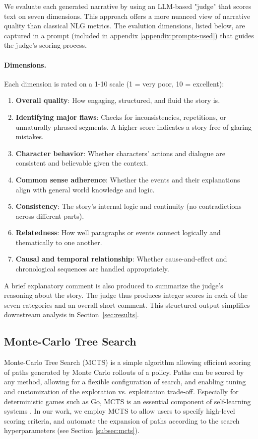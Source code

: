 \documentclass[11pt]{article}
\begin{document}
We evaluate each generated narrative by using an LLM-based "judge" that scores text on seven dimensions. This approach offers a more nuanced view of narrative quality than classical NLG metrics. The evalution dimensions, listed below, are captured in a prompt (included in appendix \ref{appendix:prompts-used}) that guides the judge's scoring process.

\paragraph{Dimensions.} Each dimension is rated on a 1-10 scale (1 = very poor, 10 = excellent):

\begin{enumerate}
    \item \textbf{Overall quality}: How engaging, structured, and fluid the story is.
    \item \textbf{Identifying major flaws}: Checks for inconsistencies, repetitions, or unnaturally phrased segments. A higher score indicates a story free of glaring mistakes.
    \item \textbf{Character behavior}: Whether characters' actions and dialogue are consistent and believable given the context.
    \item \textbf{Common sense adherence}: Whether the events and their explanations align with general world knowledge and logic.
    \item \textbf{Consistency}: The story's internal logic and continuity (no contradictions across different parts).
    \item \textbf{Relatedness}: How well paragraphs or events connect logically and thematically to one another.
    \item \textbf{Causal and temporal relationship}: Whether cause-and-effect and chronological sequences are handled appropriately.
\end{enumerate}

\noindent A brief explanatory comment is also produced to summarize the judge's reasoning about the story. The judge thus produces integer scores in each of the seven categories and an overall short comment. This structured output simplifies downstream analysis in Section~\ref{sec:results}.

\subsection{Monte-Carlo Tree Search}

Monte-Carlo Tree Search (MCTS) \citep{abramson-mcts-thesis,silver2016mastering} is a simple algorithm allowing efficient scoring of paths generated by Monte Carlo rollouts of a policy. Paths can be scored by any method, allowing for a flexible configuration of search, and enabling tuning and customization of the exploration vs. exploitation trade-off. Especially for deterministic games such as Go, MCTS is an essential component of self-learning systems \citep{silver2016mastering}. In our work, we employ MCTS to allow users to specify high-level scoring criteria, and automate the expansion of paths according to the search hyperparameters (see Section \ref{subsec:mcts}).
\end{document}
